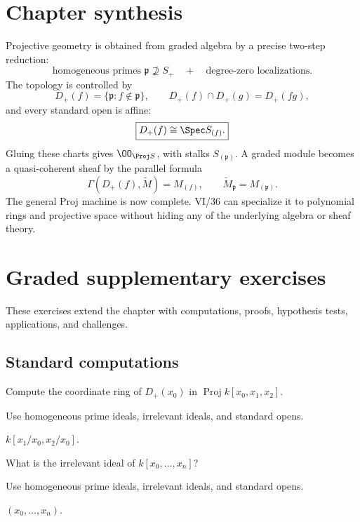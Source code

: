 \section*{Chapter synthesis}
Projective geometry is obtained from graded algebra by a precise two-step reduction:
\[
\boxed{
\text{homogeneous primes }\mathfrak p\not\supseteq S_+
\quad+\quad
\text{degree-zero localizations}.}
\]
The topology is controlled by
\[
D_+(f)=\{\mathfrak p:f\notin\mathfrak p\},
\qquad D_+(f)\cap D_+(g)=D_+(fg),
\]
and every standard open is affine:
\[
\boxed{D_+(f)\cong\Spec S_{(f)}.}
\]
Gluing these charts gives \(\OO_{\Proj S}\), with stalks \(S_{(\mathfrak p)}\).  A graded module becomes a quasi-coherent sheaf by the parallel formula
\[
\Gamma(D_+(f),\widetilde M)=M_{(f)},
\qquad \widetilde M_{\mathfrak p}=M_{(\mathfrak p)}.
\]
The general Proj machine is now complete.  VI/36 can specialize it to polynomial rings and projective space without hiding any of the underlying algebra or sheaf theory.
\section{Graded supplementary exercises}
These exercises extend the chapter with computations, proofs, hypothesis tests, applications, and challenges.

\subsection*{Standard computations}

\begin{exercise}\label{exr:vi35-expand-01}
Compute the coordinate ring of $D_+(x_0)$ in $\operatorname{Proj}k[x_0,x_1,x_2]$.
\end{exercise}
\begin{hint}
Use homogeneous prime ideals, irrelevant ideals, and standard opens.
\end{hint}
\begin{solution}
$k[x_1/x_0,x_2/x_0]$.
\end{solution}

\begin{exercise}\label{exr:vi35-expand-02}
What is the irrelevant ideal of $k[x_0,\ldots,x_n]$?
\end{exercise}
\begin{hint}
Use homogeneous prime ideals, irrelevant ideals, and standard opens.
\end{hint}
\begin{solution}
$(x_0,\ldots,x_n)$.
\end{solution}

